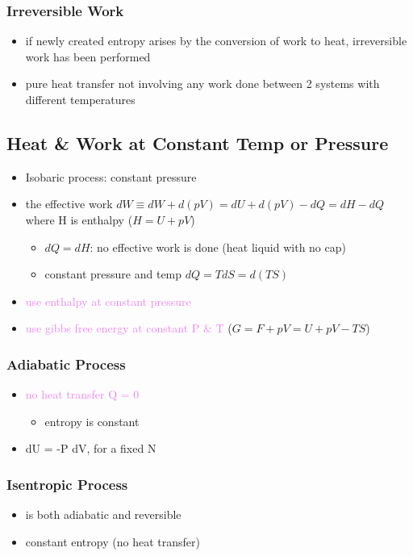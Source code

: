 \subsubsection{Irreversible Work}
\begin{itemize}
	\item if newly created entropy arises by the conversion of work to heat, irreversible
	      work has been performed
	\item pure heat transfer not involving any work done between 2 systems with different temperatures
\end{itemize}


\subsection{Heat \& Work at Constant Temp or Pressure}

\begin{itemize}
    \item Isobaric process: constant pressure
    \item the effective work $dW \equiv dW + d(pV) = dU + d(pV) -dQ = dH - dQ$
    where H is enthalpy ($H = U + pV$)
    \begin{itemize}
        \item $dQ = dH$: no effective work is done (heat liquid with no cap)
        \item constant pressure and temp $dQ = T dS = d(TS)$
    \end{itemize}
    \item \textcolor{violet}{use enthalpy at constant pressure}
    \item \textcolor{violet}{use gibbs free energy at constant P \& T} ($G = F + pV = U +pV - TS$)
\end{itemize}

\subsubsection{Adiabatic Process}
\begin{itemize}
	\item \textcolor{violet}{no heat transfer Q = 0}
	\begin{itemize}
		\item entropy is constant
	\end{itemize}
	\item dU = -P dV, for a fixed N 
\end{itemize}

\subsubsection{Isentropic Process}
\begin{itemize}
	\item is both adiabatic and reversible
	\item constant entropy (no heat transfer)
\end{itemize}

